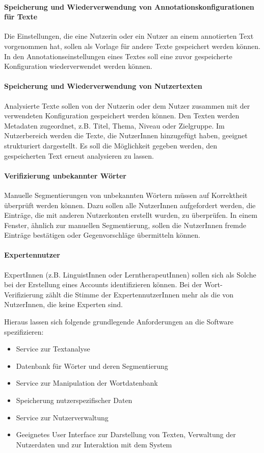 \paragraph{Speicherung und Wiederverwendung von Annotationskonfigurationen für Texte}
Die Einstellungen, die eine Nutzerin oder ein Nutzer an einem annotierten Text vorgenommen hat, sollen als Vorlage für andere Texte gespeichert werden können. In den Annotationseinstellungen eines Textes soll eine zuvor gespeicherte Konfiguration wiederverwendet werden können.

\paragraph{Speicherung und Wiederverwendung von Nutzertexten}
Analysierte Texte sollen von der Nutzerin oder dem Nutzer zusammen mit der verwendeten Konfiguration gespeichert werden können. Den Texten werden Metadaten zugeordnet, z.B. Titel, Thema, Niveau oder Zielgruppe. Im Nutzerbereich werden die Texte, die NutzerInnen hinzugefügt haben, geeignet strukturiert dargestellt. Es soll die Möglichkeit gegeben werden, den gespeicherten Text erneut analysieren zu lassen.

\paragraph{Verifizierung unbekannter Wörter}
Manuelle Segmentierungen von unbekannten Wörtern müssen auf Korrektheit überprüft werden können. Dazu sollen alle NutzerInnen aufgefordert werden, die Einträge, die mit anderen Nutzerkonten erstellt wurden, zu überprüfen. In einem Fenster, ähnlich zur manuellen Segmentierung, sollen die NutzerInnen fremde Einträge bestätigen oder Gegenvorschläge übermitteln können.

\paragraph{Expertennutzer}
ExpertInnen (z.B. LinguistInnen oder LerntherapeutInnen) sollen sich als Solche bei der Erstellung eines Accounts identifizieren können. Bei der Wort-Verifizierung zählt die Stimme der ExpertennutzerInnen mehr als die von NutzerInnen, die keine Experten sind.

Hieraus lassen sich folgende grundlegende Anforderungen an die Software spezifizieren:

\begin{itemize}
	\item Service zur Textanalyse
	\item Datenbank für Wörter und deren Segmentierung
	\item Service zur Manipulation der Wortdatenbank
	\item Speicherung nutzerspezifischer Daten
	\item Service zur Nutzerverwaltung
	\item Geeignetes User Interface zur Darstellung von Texten, Verwaltung der Nutzerdaten und zur Interaktion mit dem System
\end{itemize}

